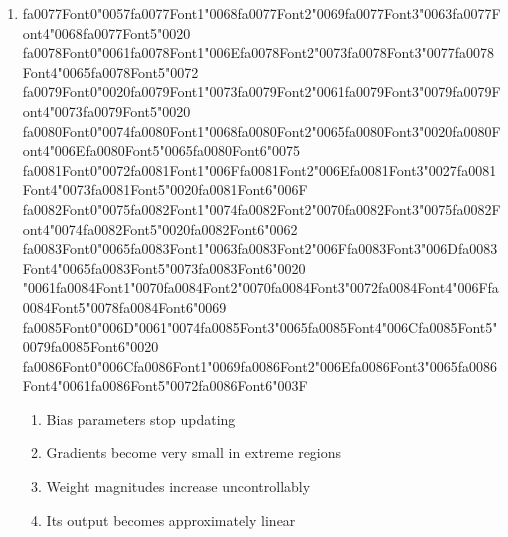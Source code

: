 \documentclass[12pt]{article}
\begin{document}
\begin{enumerate}[label=Q\arabic*.]
 \item {\csname fa0077Font0\endcsname\char"0057}{\csname fa0077Font1\endcsname\char"0068}{\csname fa0077Font2\endcsname\char"0069}{\csname fa0077Font3\endcsname\char"0063}{\csname fa0077Font4\endcsname\char"0068}{\csname fa0077Font5\endcsname\char"0020} {\csname fa0078Font0\endcsname\char"0061}{\csname fa0078Font1\endcsname\char"006E}{\csname fa0078Font2\endcsname\char"0073}{\csname fa0078Font3\endcsname\char"0077}{\csname fa0078Font4\endcsname\char"0065}{\csname fa0078Font5\endcsname\char"0072} {\csname fa0079Font0\endcsname\char"0020}{\csname fa0079Font1\endcsname\char"0073}{\csname fa0079Font2\endcsname\char"0061}{\csname fa0079Font3\endcsname\char"0079}{\csname fa0079Font4\endcsname\char"0073}{\csname fa0079Font5\endcsname\char"0020} {\csname fa0080Font0\endcsname\char"0074}{\csname fa0080Font1\endcsname\char"0068}{\csname fa0080Font2\endcsname\char"0065}{\csname fa0080Font3\endcsname\char"0020}{\csname fa0080Font4\endcsname\char"006E}{\csname fa0080Font5\endcsname\char"0065}{\csname fa0080Font6\endcsname\char"0075} {\csname fa0081Font0\endcsname\char"0072}{\csname fa0081Font1\endcsname\char"006F}{\csname fa0081Font2\endcsname\char"006E}{\csname fa0081Font3\endcsname\char"0027}{\csname fa0081Font4\endcsname\char"0073}{\csname fa0081Font5\endcsname\char"0020}{\csname fa0081Font6\endcsname\char"006F} {\csname fa0082Font0\endcsname\char"0075}{\csname fa0082Font1\endcsname\char"0074}{\csname fa0082Font2\endcsname\char"0070}{\csname fa0082Font3\endcsname\char"0075}{\csname fa0082Font4\endcsname\char"0074}{\csname fa0082Font5\endcsname\char"0020}{\csname fa0082Font6\endcsname\char"0062} {\csname fa0083Font0\endcsname\char"0065}{\csname fa0083Font1\endcsname\char"0063}{\csname fa0083Font2\endcsname\char"006F}{\csname fa0083Font3\endcsname\char"006D}{\csname fa0083Font4\endcsname\char"0065}{\csname fa0083Font5\endcsname\char"0073}{\csname fa0083Font6\endcsname\char"0020} {\char"0061}{\csname fa0084Font1\endcsname\char"0070}{\csname fa0084Font2\endcsname\char"0070}{\csname fa0084Font3\endcsname\char"0072}{\csname fa0084Font4\endcsname\char"006F}{\csname fa0084Font5\endcsname\char"0078}{\csname fa0084Font6\endcsname\char"0069} {\csname fa0085Font0\endcsname\char"006D}{\char"0061}{\char"0074}{\csname fa0085Font3\endcsname\char"0065}{\csname fa0085Font4\endcsname\char"006C}{\csname fa0085Font5\endcsname\char"0079}{\csname fa0085Font6\endcsname\char"0020} {\csname fa0086Font0\endcsname\char"006C}{\csname fa0086Font1\endcsname\char"0069}{\csname fa0086Font2\endcsname\char"006E}{\csname fa0086Font3\endcsname\char"0065}{\csname fa0086Font4\endcsname\char"0061}{\csname fa0086Font5\endcsname\char"0072}{\csname fa0086Font6\endcsname\char"003F}
 \begin{enumerate}[label=(\Alph*)]
     \item Bias parameters stop updating
     \item Gradients become very small in extreme regions
     \item Weight magnitudes increase uncontrollably
     \item Its output becomes approximately linear
 \end{enumerate}
 

\end{enumerate}
\end{document}
